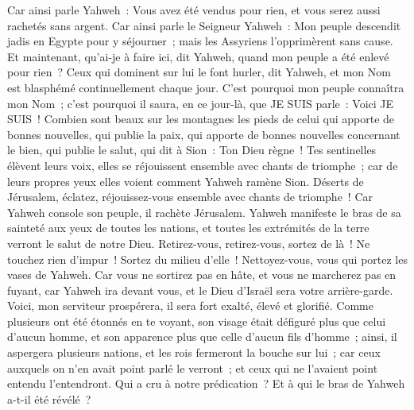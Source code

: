 \begin{multicols}{2}
Car ainsi parle Yahweh~: Vous avez été vendus pour rien, et vous serez aussi rachetés sans argent.
Car ainsi parle le Seigneur Yahweh~: Mon peuple descendit jadis en Egypte pour y séjourner~; mais les Assyriens l'opprimèrent sans cause.
Et maintenant, qu'ai-je à faire ici, dit Yahweh, quand mon peuple a été enlevé pour rien~? Ceux qui dominent sur lui le font hurler, dit Yahweh, et mon Nom est blasphémé continuellement chaque jour.
C'est pourquoi mon peuple connaîtra mon Nom~; c'est pourquoi il saura, en ce jour-là, que JE SUIS parle~: Voici JE SUIS~!
Combien sont beaux sur les montagnes les pieds de celui qui apporte de bonnes nouvelles, qui publie la paix, qui apporte de bonnes nouvelles concernant le bien, qui publie le salut, qui dit à Sion~: Ton Dieu règne~!
Tes sentinelles élèvent leurs voix, elles se réjouissent ensemble avec chants de triomphe~; car de leurs propres yeux elles voient comment Yahweh ramène Sion.
Déserts de Jérusalem, éclatez, réjouissez-vous ensemble avec chants de triomphe~! Car Yahweh console son peuple, il rachète Jérusalem.
Yahweh manifeste le bras de sa sainteté aux yeux de toutes les nations, et toutes les extrémités de la terre verront le salut de notre Dieu.
Retirez-vous, retirez-vous, sortez de là~! Ne touchez rien d'impur~! Sortez du milieu d'elle~! Nettoyez-vous, vous qui portez les vases de Yahweh.
Car vous ne sortirez pas en hâte, et vous ne marcherez pas en fuyant, car Yahweh ira devant vous, et le Dieu d'Israël sera votre arrière-garde.
Voici, mon serviteur prospérera, il sera fort exalté, élevé et glorifié.
Comme plusieurs ont été étonnés en te voyant, son visage était défiguré plus que celui d'aucun homme, et son apparence plus que celle d'aucun fils d'homme~;
ainsi, il aspergera plusieurs nations, et les rois fermeront la bouche sur lui~; car ceux auxquels on n'en avait point parlé le verront~; et ceux qui ne l'avaient point entendu l'entendront.
\VerseOne{}Qui a cru à notre prédication~? Et à qui le bras de Yahweh a-t-il été révélé~?

\end{multicols}
